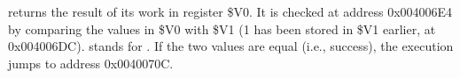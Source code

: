 \scanf returns the result of its work in register \$V0. It is checked at address 0x004006E4
by comparing the values in \$V0 with \$V1 (1 has been stored in \$V1 earlier, at 0x004006DC).
 stands for .
If the two values are equal (i.e., success), the execution jumps to address 0x0040070C.

